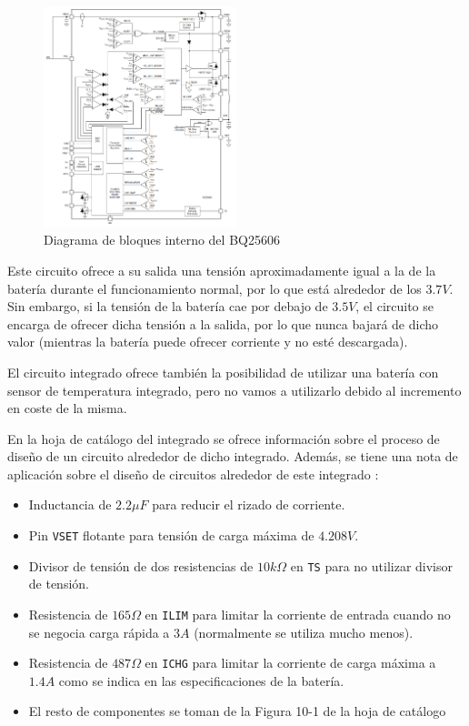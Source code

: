 \begin{figure}[h]
    \centering
    \includegraphics[width=0.5\textwidth]{images/2/2-1/BQ25606Bloques.png}
    \caption{Diagrama de bloques interno del BQ25606}
    \label{fig:2-1-bloquesInternosBQ25606}
\end{figure}

Este circuito ofrece a su salida una tensión aproximadamente igual a la de la batería durante el funcionamiento normal, por lo que está alrededor de los $3.7 V$. Sin embargo, si la tensión de la batería cae por debajo de $3.5 V$, el circuito se encarga de ofrecer dicha tensión a la salida, por lo que nunca bajará de dicho valor (mientras la batería puede ofrecer corriente y no esté descargada).

El circuito integrado ofrece también la posibilidad de utilizar una batería con sensor de temperatura integrado, pero no vamos a utilizarlo debido al incremento en coste de la misma.

En la hoja de catálogo del integrado se ofrece información sobre el proceso de diseño de un circuito alrededor de dicho integrado. Además, se tiene una nota de aplicación sobre el diseño de circuitos alrededor de este integrado \cite{texasinstrumentsDesigningStandaloneSingle}:

\begin{itemize}
    \item Inductancia de $2.2 \mu F$ para reducir el rizado de corriente.
    \item Pin \texttt{VSET} flotante para tensión de carga máxima de $4.208 V$.
    \item Divisor de tensión de dos resistencias de $10 k\Omega$ en \texttt{TS} para no utilizar divisor de tensión.
    \item Resistencia de $165 \Omega$ en \texttt{ILIM} para limitar la corriente de entrada cuando no se negocia carga rápida a $3 A$ (normalmente se utiliza mucho menos).
    \item Resistencia de $487 \Omega$ en \texttt{ICHG} para limitar la corriente de carga máxima a $1.4 A$ como se indica en las especificaciones de la batería.
    \item El resto de componentes se toman de la Figura 10-1 de la hoja de catálogo
\end{itemize}

